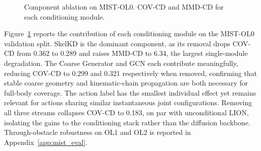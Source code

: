 \documentclass{article}
\begin{document}
\begin{figure}[t]
\caption{
  Component ablation on MIST-OL0.
  COV-CD and MMD-CD for each conditioning module.
}
\label{fig:ablation}
\end{figure}


Figure~\ref{fig:ablation} reports the contribution of each conditioning module
on the MIST-OL0 validation split.
SkelKD is the dominant component, as its removal drops COV-CD from 0.362 to 0.289
and raises MMD-CD to 6.34, the largest single-module degradation.
The Coarse Generator and GCN each contribute meaningfully, reducing COV-CD to 0.299 and 0.321
respectively when removed, confirming that stable coarse geometry and kinematic-chain
propagation are both necessary for full-body coverage.
The action label has the smallest individual effect yet remains relevant for actions
sharing similar instantaneous joint configurations.
Removing all three streams collapses COV-CD to 0.183, on par with unconditional LION,
isolating the gains to the conditioning stack rather than the diffusion backbone.
Through-obstacle robustness on OL1 and OL2 is reported in Appendix~\ref{app:mist_eval}.
\end{document}

